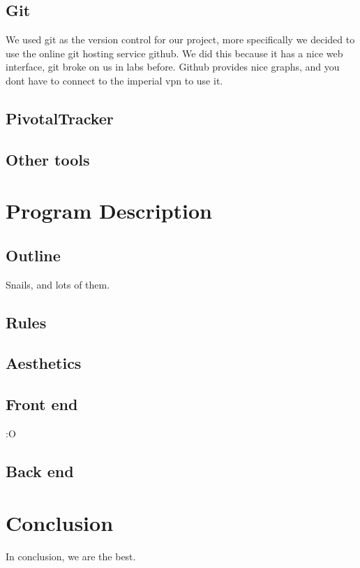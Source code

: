\documentclass{article}
\begin{document}
\subsection{Git}
We used git as the version control for our project, more specifically we decided to use the online git hosting service github. We did this because it has a nice web interface, git broke on us in labs before. Github provides nice graphs, and you dont have to connect to the imperial vpn to use it.
\subsection{PivotalTracker}
\subsection{Other tools}

\section{Program Description}
\subsection{Outline}
Snails, and lots of them.
\subsection{Rules}
\subsection{Aesthetics}
\subsection{Front end}
:O
\subsection{Back end}

\section{Conclusion}
In conclusion, we are the best.
\end{document}
